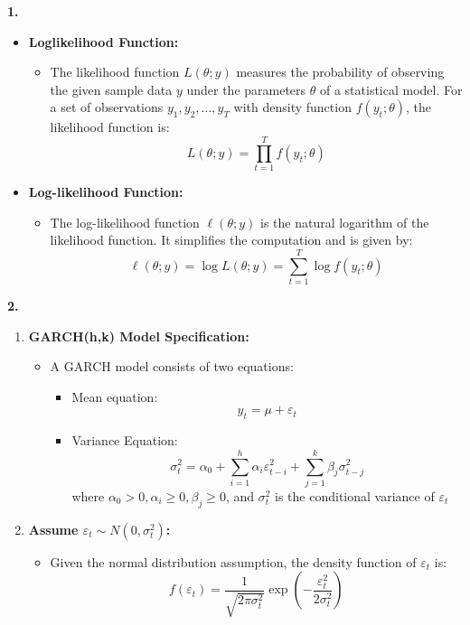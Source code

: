 \begin{footnotesize}
\textbf{1.}
\begin{itemize}
    \item \textbf{Loglikelihood Function:}
    \begin{itemize}
        \item The likelihood function $L(\theta;y)$ measures the probability of observing the given sample data $y$ under the parameters $\theta$ of a statistical model. For a set of observations $y_1,y_2,\ldots, y_T$ with density function $f(y_t;\theta)$, the likelihood function is: \[
        L(\theta;y)=\prod_{t=1}^T f(y_t;\theta)
        \]
    \end{itemize}
    \item \textbf{Log-likelihood Function:}
    \begin{itemize}
        \item The log-likelihood function $\ell (\theta;y)$ is the natural logarithm of the likelihood function. It simplifies the computation and is given by: \[
        \ell (\theta;y) = \log L(\theta;y)=\sum_{t=1}^T \log f(y_t;\theta)
        \]
    \end{itemize}
\end{itemize}
\textbf{2.} 
\begin{enumerate}
    \item \textbf{GARCH(h,k) Model Specification:}
    \begin{itemize}
        \item A GARCH model consists of two equations:
        \begin{itemize}
            \item Mean equation: \[
            y_t=\mu + \varepsilon_t
            \]
            \item Variance Equation: \[
            \sigma_t^2 = \alpha_0 + \sum_{i=1}^h \alpha_i \varepsilon_{t-i}^2 + \sum_{j=1}^k \beta_j \sigma_{t-j}^2
            \] where $\alpha_0>0, \alpha_i\geq 0, \beta_j \geq0$, and $\sigma_t^2$ is the conditional variance of $\varepsilon_t$
        \end{itemize}
    \end{itemize}
    \item \textbf{Assume $\varepsilon_t \sim N(0,\sigma_t^2)$:}
    \begin{itemize}
        \item Given the normal distribution assumption, the density function of $\varepsilon_t$ is: \[
        f(\varepsilon_t) = \frac{1}{\sqrt{2\pi \sigma_t^2}} \exp \left(-\frac{\varepsilon_t^2}{2\sigma_t^2}\right)
        \]
    \end{itemize}

\end{enumerate}
\end{footnotesize}
